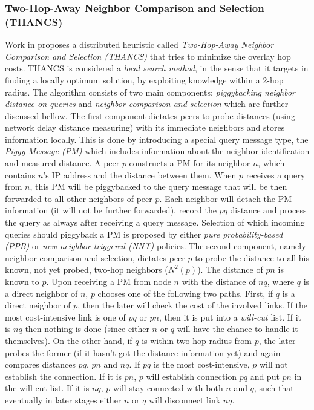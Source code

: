 \subsubsection{Two-Hop-Away Neighbor Comparison and Selection (THANCS)}
Work in \cite{LNXE2005,L2008} proposes a distributed heuristic
called \emph{Two-Hop-Away Neighbor Comparison and Selection (THANCS)} that
tries to minimize the overlay hop costs. THANCS is considered a \emph{local
search method}, in the sense that it targets in finding a locally optimum
solution, by exploiting knowledge within a 2-hop radius. The algorithm consists
of two main components: \emph{piggybacking neighbor distance on queries} and
\emph{neighbor comparison and selection} which are further discussed bellow.
The first component dictates peers to probe distances (using network delay
distance measuring) with its immediate neighbors and stores information
locally. This is done by introducing a special query message type, the
\emph{Piggy Message (PM)} which includes information about the neighbor
identification and measured distance. A peer $p$ constructs a PM for its
neighbor $n$, which contains $n$'s IP address and the distance between them.
When $p$ receives a query from $n$, this PM will be piggybacked to the query
message that will be then forwarded to all other neighbors of peer $p$. 
Each neighbor will detach the PM information (it will not be further forwarded),
record the $pq$ distance and process the query as always after receiving a query
message. Selection of which incoming queries should piggyback a PM is proposed
by either \emph{pure probability-based (PPB)} or \emph{new neighbor triggered
(NNT)} policies. The second component, namely neighbor comparison and selection,
dictates peer $p$ to probe the distance to all his known, not yet probed,
two-hop neighbors ($ N^2(p)$). The distance of $pn$ is known to $p$. Upon
receiving a PM from node $n$ with the distance of $nq$, where $q$ is a direct
neighbor of $n$, $p$ chooses one of the following two paths. First, if $q$ is a
direct neighbor of $p$, then the later will check the cost of the involved
links. If the most cost-intensive link is one of $pq$ or $pn$, then it is put
into a \emph{will-cut} list. If it is $nq$ then nothing is done (since either
$n$ or $q$ will have the chance to handle it themselves).  On the other hand, if
$q$ is within two-hop radius from $p$, the later probes the former (if it hasn't
got the distance information yet) and again compares distances $pq$, $pn$ and
$nq$. If $pq$ is the most cost-intensive, $p$ will not establish the connection.
If it is $pn$, $p$ will establish connection $pq$ and put $pn$ in the will-cut
list. If it is $nq$, $p$ will stay connected with both $n$ and $q$,
such that eventually in later stages either $n$ or $q$ will disconnect link $nq$.

